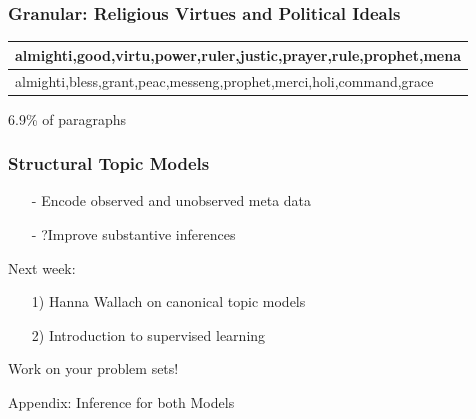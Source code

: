 \documentclass{beamer}
\numberwithin{equation}{section}
\begin{document}
\begin{frame}

\begin{center}
\end{center}

\end{frame}


\begin{frame}
\frametitle{Granular: Religious Virtues and Political Ideals}


\begin{tabular}{l}
\hline
almighti,good,virtu,power,ruler,justic,prayer,rule,prophet,mena\\
\hline 
\alert{almighti,bless,grant,peac,messeng,prophet,merci,holi,command,grace}
\end{tabular}

\vspace{0.5in}

6.9\% of paragraphs


\end{frame}



\begin{frame}

\begin{center}
\end{center}

\end{frame}


\begin{frame}
\frametitle{Structural Topic Models}

\begin{itemize}
\item[-] Encode observed and unobserved meta data
\item[-] ?Improve substantive inferences
\end{itemize}

Next week:
\begin{itemize}
\item[1)] Hanna Wallach on canonical topic models
\item[2)] Introduction to supervised learning
\end{itemize}

Work on your problem sets!

\end{frame}


\begin{frame}

Appendix: Inference for both Models


\end{frame}
\end{document}
